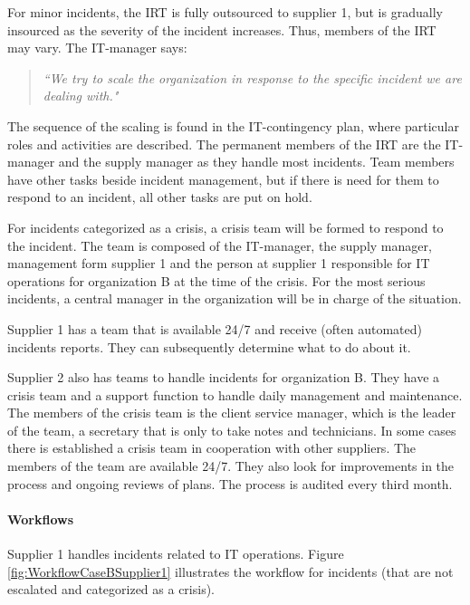 For minor incidents, the \ac{IRT} is fully outsourced to supplier 1, but is gradually insourced as the severity of the incident increases. Thus, members of the \ac{IRT} may vary. The IT-manager says:
\begin{quote}
\textit{``We try to scale the organization in response to the specific incident we are dealing with."}
\end{quote}

The sequence of the scaling is found in the IT-contingency plan, where particular roles and activities are described. The permanent members of the \ac{IRT} are the IT-manager and the supply manager as they handle most incidents. Team members have other tasks beside incident management, but if there is need for them to respond to an incident, all other tasks are put on hold.

For incidents categorized as a crisis, a crisis team will be formed to respond to the incident. The team is composed of the IT-manager, the supply manager, management form supplier 1 and the person at supplier 1 responsible for IT operations for organization B at the time of the crisis. For the most serious incidents, a central manager in the organization will be in charge of the situation.

Supplier 1 has a team that is available 24/7 and receive (often automated) incidents reports. They can subsequently determine what to do about it.

Supplier 2 also has teams to handle incidents for organization B. They have a crisis team and a support function to handle daily management and maintenance. The members of the crisis team is the client service manager, which is the leader of the team, a secretary that is only to take notes and technicians. In some cases there is established a crisis team in cooperation with other suppliers. The members of the team are available 24/7. They also look for improvements in the process and ongoing reviews of plans. The process is audited every third month.

\paragraph{Workflows}

Supplier 1 handles incidents related to IT operations. Figure \ref{fig:WorkflowCaseBSupplier1} illustrates the workflow for incidents (that are not escalated and categorized as a crisis).

